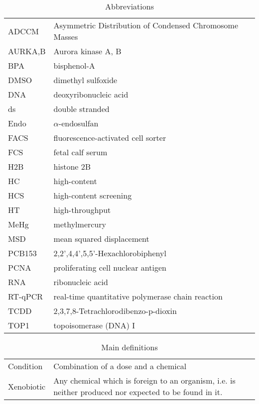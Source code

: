 \documentclass[11pt, oneside]{Thesis} %
\begin{document}
\clearpage %
\begin{table}
\caption{Abbreviations}
\begin{tabular}{ll}
ADCCM &Asymmetric Distribution of Condensed Chromosome Masses\\
AURKA,B & Aurora kinase A, B\\
BPA & bisphenol-A \\
DMSO & dimethyl sulfoxide\\
DNA & deoxyribonucleic acid\\
ds & double stranded \\
Endo & $\alpha$-endosulfan \\
FACS & fluorescence-activated cell sorter\\
FCS & fetal calf serum\\
H2B & histone 2B\\
HC & high-content\\
HCS & high-content screening\\
HT & high-throughput\\
MeHg & methylmercury\\
MSD & mean squared displacement\\
PCB153 & 2,2',4,4',5,5'-Hexachlorobiphenyl\\
PCNA & proliferating cell nuclear antigen\\
RNA & ribonucleic acid\\
RT-qPCR & real-time quantitative polymerase chain reaction\\
TCDD & 2,3,7,8-Tetrachlorodibenzo-p-dioxin\\
TOP1 & topoisomerase (DNA) I\\
\end{tabular}
\end{table}
\begin{table}
\caption{Main definitions}
\begin{tabular}{lL{10cm}}
Condition & Combination of a dose and a chemical\\
Xenobiotic & Any chemical which is foreign to an organism, i.e. is neither produced nor expected to be found in it.
\end{tabular}
\end{table}
\clearpage %

\end{document}
